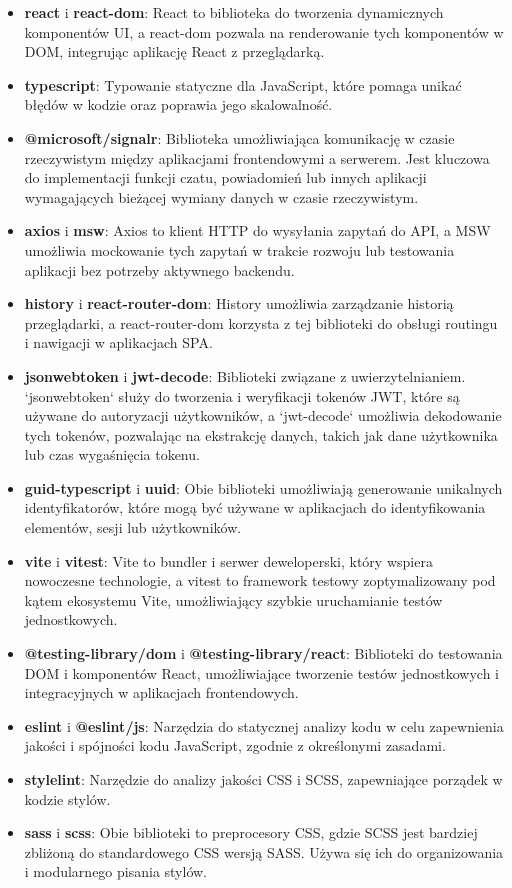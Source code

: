 \documentclass[12pt,a4paper]{article}
\begin{document}
\begin{itemize} 
    \item \textbf{react} i \textbf{react-dom}: React to biblioteka do tworzenia dynamicznych komponentów UI, a react-dom pozwala na renderowanie tych komponentów w DOM, integrując aplikację React z przeglądarką. 
    \item \textbf{typescript}: Typowanie statyczne dla JavaScript, które pomaga unikać błędów w kodzie oraz poprawia jego skalowalność.
    \item \textbf{@microsoft/signalr}: Biblioteka umożliwiająca komunikację w czasie rzeczywistym między aplikacjami frontendowymi a serwerem. Jest kluczowa do implementacji funkcji czatu, powiadomień lub innych aplikacji wymagających bieżącej wymiany danych w czasie rzeczywistym.
    \item \textbf{axios} i \textbf{msw}: Axios to klient HTTP do wysyłania zapytań do API, a MSW umożliwia mockowanie tych zapytań w trakcie rozwoju lub testowania aplikacji bez potrzeby aktywnego backendu. 
    \item \textbf{history} i \textbf{react-router-dom}: History umożliwia zarządzanie historią przeglądarki, a react-router-dom korzysta z tej biblioteki do obsługi routingu i nawigacji w aplikacjach SPA. 
    \item \textbf{jsonwebtoken} i \textbf{jwt-decode}: Biblioteki związane z uwierzytelnianiem. `jsonwebtoken` służy do tworzenia i weryfikacji tokenów JWT, które są używane do autoryzacji użytkowników, a `jwt-decode` umożliwia dekodowanie tych tokenów, pozwalając na ekstrakcję danych, takich jak dane użytkownika lub czas wygaśnięcia tokenu.
    \item \textbf{guid-typescript} i \textbf{uuid}: Obie biblioteki umożliwiają generowanie unikalnych identyfikatorów, które mogą być używane w aplikacjach do identyfikowania elementów, sesji lub użytkowników. 
    \item \textbf{vite} i \textbf{vitest}: Vite to bundler i serwer deweloperski, który wspiera nowoczesne technologie, a vitest to framework testowy zoptymalizowany pod kątem ekosystemu Vite, umożliwiający szybkie uruchamianie testów jednostkowych. 
    \item \textbf{@testing-library/dom} i \textbf{@testing-library/react}: Biblioteki do testowania DOM i komponentów React, umożliwiające tworzenie testów jednostkowych i integracyjnych w aplikacjach frontendowych. 
    \item \textbf{eslint} i \textbf{@eslint/js}: Narzędzia do statycznej analizy kodu w celu zapewnienia jakości i spójności kodu JavaScript, zgodnie z określonymi zasadami. 
    \item \textbf{stylelint}: Narzędzie do analizy jakości CSS i SCSS, zapewniające porządek w kodzie stylów. 
    \item \textbf{sass} i \textbf{scss}: Obie biblioteki to preprocesory CSS, gdzie SCSS jest bardziej zbliżoną do standardowego CSS wersją SASS. Używa się ich do organizowania i modularnego pisania stylów. 
\end{itemize}
\end{document}
